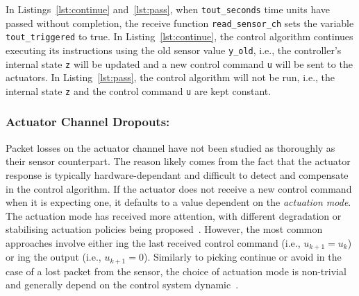 In Listings~\ref{lst:continue} and~\ref{lst:pass}, when \texttt{tout\_seconds} time units have passed without completion, the receive function \texttt{read\_sensor\_ch} sets the variable \texttt{tout\_triggered} to true.
In Listing~\ref{lst:continue}, the control algorithm continues executing its instructions using the old sensor value \texttt{y\_old}, i.e., the controller's internal state \texttt{z} will be updated and a new control command \texttt{u} will be sent to the actuators.
In Listing~\ref{lst:pass}, the control algorithm will not be run, i.e., the internal state \texttt{z} and the control command \texttt{u} are kept constant.

\subsubsection*{Actuator Channel Dropouts:}
Packet losses on the actuator channel have not been studied as thoroughly as their sensor counterpart.
The reason likely comes from the fact that the actuator response is typically hardware-dependant and difficult to detect and compensate in the control algorithm.
If the actuator does not receive a new control command when it is expecting one, it defaults to a value dependent on the \emph{actuation mode}.
The actuation mode has received more attention, with different degradation or stabilising actuation policies being proposed~\cite{Ma:2018}.
However, the most common approaches involve either \tH{}ing the last received control command (i.e., $u_{k+1} = u_k$) or \tZ{}ing the output (i.e., $u_{k+1}=0$).
Similarly to picking continue or avoid in the case of a lost packet from the sensor, the choice of actuation mode is non-trivial and generally depend on the control system dynamic~\cite{Schenato:2009, Vreman:2021}.


